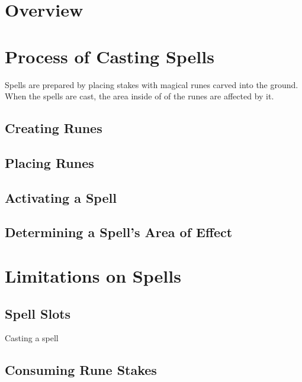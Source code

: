 \section{Overview}


\section{Process of Casting Spells}
Spells are prepared by placing stakes with magical runes carved into the ground. When the spells are cast, the area inside of of the runes are affected by it.

\subsection{Creating Runes}


\subsection{Placing Runes}

\subsection{Activating a Spell}

\subsection{Determining a Spell's Area of Effect}

\section{Limitations on Spells}

\subsection{Spell Slots}
Casting a spell 

\subsection{Consuming Rune Stakes}